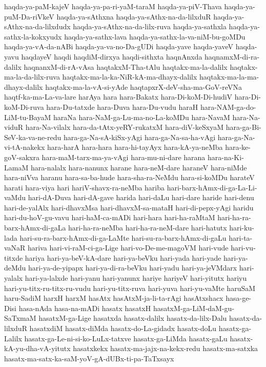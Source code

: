 {haqda-ya-paM-kajeV
haqda-ya-pa-ri-yaM-taraM
haqda-ya-piV-Thava
haqda-ya-puM-Da-riVkeV
haqda-ya-sAthxna
haqda-ya-sAthx-na-da-lilxduR
haqda-ya-sAthx-na-da-lilxdudx
haqda-ya-sAthx-na-da-lilx-ruva
haqda-ya-sathxla
haqda-ya-sathx-la-kokxyudx
haqda-ya-sathx-lava
haqda-ya-sathx-la-va-niM-bu-goMDu
haqda-ya-vA-da-nABi
haqda-ya-va-no-Da-gUDi
haqda-yave
haqda-yaveV
haqda-yavu
haqdayeV
haqdi
haqdiM-dirxya
haqdi-sithxta
haqnAnxda
haqnamxM-di-ra-dalilx
haqnanxM-di-rA-vAsa
haqtakxM-Tha-tAlu
haqtakx-ma-la-dalilx
haqtakx-ma-la-da-lilx-ruva
haqtakx-ma-la-ka-NiR-kA-ma-dhayx-dalilx
haqtakx-ma-la-ma-dhayx-dalilx
haqtakx-ma-la-vA-si-yAde
haqtapxrX-deV-sha-ma-GoV-reVNa
haqtf-ka-ma-La-va-lare
harAya
hara
hara-Bakatx
hara-Di-koM-Di-hudiV
hara-Di-koM-Di-ruva
hara-Du-tatxde
hara-Duva
hara-Du-vudu
haraH
hara-NAM-ga-do-LiM-tu-BayaM
haraNa
hara-NaM-ga-Lu-ma-no-La-koMDu
hara-NavaM
hara-Na-viduR
hara-Na-vilalx
hara-da-tAtx-yeRY-rukatxM
hara-diV-keSxyaM
hara-ga-Bi-SeV-ka-va-ne-redu
hara-ga-Na-sA-kiSx-yAgi
hara-ga-Na-sa-ha-vAgi
hara-ga-Na-vi-tA-nakekx
hara-harA
hara-hara
hara-hi-tayAyx
hara-kA-ya-neMba
hara-ke-goV-sakxra
hara-maM-tarx-ma-ya-vAgi
hara-mu-ni-dare
harana
hara-na-Ki-LamaM
hara-nalalx
hara-nanunx
harane
hara-neM-dare
haraneV
hara-niMde
hara-niVva
haranu
hara-sa-ba-hude
hara-sha-ra-NeMdu
hara-si-koMDu
harateV
harati
hara-viya
hari
hariV-shavx-ra-neMba
hariba
hari-barx-hAmx-di-ga-La-Li-vaMdu
hari-dA-Duva
hari-dA-gave
harida
hari-daLu
hari-dare
haride
hari-denu
hari-de-yalAlx
hari-dhavxMsa
hari-dhavxM-sa-mataH
hari-di-pepx-yAgi
haridu
hari-du-hoV-gu-vavu
hari-haM-ca-mADi
hari-hara
hari-ha-raMtaM
hari-ha-ra-barx-hAmx-di-gaLa
hari-ha-ra-neMba
hari-ha-ra-neM-dare
hari-hatutx
hari-ku-lada
hari-su-ra-barx-hAmx-di-ga-LaMte
hari-su-ra-barx-hAmx-di-gaLu
hari-ta-vaNaR
hariva
hari-vi-raM-ci-ga-Lige
hari-vo-De-me-magoVM
hari-vude
hari-vu-titxde
hariya
hari-ya-beV-kA-dare
hari-ya-beVku
hari-yada
hari-yade
hari-ya-deMdu
hari-ya-de-yipapx
hari-ya-di-ra-beVku
hari-yadu
hari-ya-jeVMdarx
hari-yalalx
hari-ya-lalxde
hari-yanu
hari-yanunx
hariye
hariyeV
hari-yitutx
hariyu
hari-yu-titx-ru-titx-ru-vudu
hari-yu-titx-ruva
hari-yuva
hari-yu-vaMte
haruSaM
haru-SadiM
harxH
harxM
hasAtx
hasAtxM-ja-li-ta-rAgi
hasAtxshacx
hasa-ge-Disi
hasa-nAda
hasa-na-mADi
hasatx
hasatxH
hasatxM-ga-LiM-daM-gu-SaTxmaM
hasatxM-ga-Lige
hasatxda
hasatx-dalilx
hasatx-da-lilx-Dalu
hasatx-da-lilxduR
hasatxdiM
hasatx-diMda
hasatx-do-La-gidadx
hasatx-doLu
hasatx-ga-Lalilx
hasatx-ga-Le-ni-si-ko-LuLx-tatxve
hasatx-ga-LiMda
hasatx-gaLu
hasatx-kA-yu-dha-vA-yitutx
hasatxkekx
hasatx-ma-jajx-na-kekx-redu
hasatx-ma-satxka
hasatx-ma-satx-ka-saM-yoV-gA-dUBx-ti-pa-TaTxsayx
}
